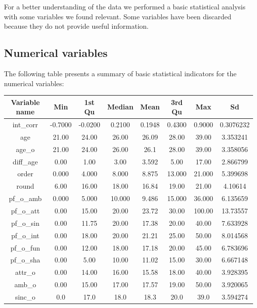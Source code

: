 
For a better understanding of the data we performed a basic statistical analysis with some variables we found relevant. Some variables have been discarded because they do not provide useful information.%

\subsection{Numerical variables}
The following table presents a summary of basic statistical indicators for the numerical variables:

\begin{table}[h!]
\centering
\begin{tabular}{||c c c c c c c c||} 
 \hline
 \textbf{Variable name} & \textbf{Min}  & \textbf{1st Qu} &\textbf{Median} & \textbf{Mean} & \textbf{3rd Qu} & \textbf{Max} & \textbf{Sd} \\ [0.5ex] 
 \hline\hline
 int\_corr & -0.7000 & -0.0200 &  0.2100 &  0.1948 &  0.4300 &  0.9000 & 0.3076232 \\
 age & 21.00 &  24.00 &  26.00 &  26.09  & 28.00 &  39.00 & 3.353241 \\
 age\_o & 21.00 &  24.00 &  26.00 &  26.1  & 28.00 &  39.00 & 3.358056 \\
 diff\_age & 0.00 &  1.00 &  3.00 &  3.592  & 5.00 &  17.00 & 2.866799 \\
 order & 0.000 & 4.000 & 8.000 & 8.875 & 13.000 & 21.000 & 5.399698 \\
 round & 6.00 & 16.00 & 18.00 & 16.84 & 19.00 & 21.00 & 4.10614 \\
 pf\_o\_amb &  0.000 &  5.000 & 10.000 &  9.486 & 15.000 & 36.000 & 6.135659 \\
 pf\_o\_att & 0.00 &  15.00 &  20.00 &  23.72 &  30.00 & 100.00 & 13.73557 \\
 pf\_o\_sin &   0.00 &  11.75 &  20.00 &  17.38 &  20.00  & 40.00 & 7.633928 \\
 pf\_o\_int & 0.00 &  18.00 &  20.00 &  21.21 &  25.00 &  50.00 & 8.014568 \\
 pf\_o\_fun  & 0.00  & 12.00 &  18.00 &  17.18 &  20.00 &  45.00 & 6.783696 \\
 pf\_o\_sha & 0.00 &  5.00 &  10.00 &  11.02 &  15.00  & 30.00 & 6.667148 \\
 attr\_o & 0.00 &  14.00 &  16.00 &  15.58 &  18.00  & 40.00 & 3.928395 \\
 amb\_o & 0.00 &  15.00 &  17.00 &  17.57 &  19.00  & 50.00 & 3.920065 \\
 sinc\_o & 0.0 &   17.0  &  18.0  &  18.3  &  20.0  &  39.0 & 3.594274 \\

\end{tabular}
\end{table}
